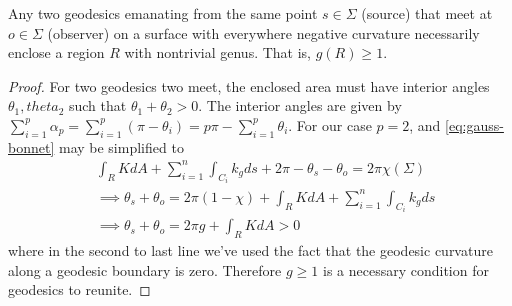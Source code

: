 \begin{theorem}[]\label{}
Any two geodesics emanating from the same point $s \in \Sigma$ (source) that meet at $o \in \Sigma$ (observer) on a surface with everywhere negative curvature necessarily enclose a region $R$ with nontrivial genus. That is, $g(R) \ge 1$.
\end{theorem}
\begin{proof}
For two geodesics two meet, the enclosed area must have interior angles $\theta_1, theta_2$ such that $\theta_1 + \theta_2 > 0$. The interior angles are given by $\sum_{i=1}^p \alpha_p = \sum_{i=1}^p(\pi-\theta_i) = p \pi - \sum_{i=1}^p \theta_i$. For our case $p=2$, and \cref{eq:gauss-bonnet} may be simplified to
\begin{align*}
&\int_R K dA + \sum_{i=1}^n \int_{C_i} k_g ds + 2 \pi - \theta_s - \theta_o = 2 \pi \chi(\Sigma) \\
&\implies \theta_s + \theta_o = 2 \pi (1 - \chi) + \int_R K dA + \sum_{i=1}^n \int_{C_i} k_g ds \\
&\implies \theta_s + \theta_o = 2 \pi g + \int_R K dA > 0
\end{align*}
where in the second to last line we've used the fact that the geodesic curvature along a geodesic boundary is zero.
Therefore $g \ge 1$ is a necessary condition for geodesics to reunite.
\end{proof}



